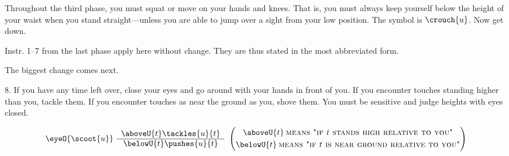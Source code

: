 Throughout the third phase, you must squat or move on your hands 
and knees. That is, you must always keep yourself below the height of your 
waist when you stand straight---unless you are able to jump over a sight from 
your low position. The symbol is $\crouch{u}$. Now get down. 

Instr. 1--7 from the last phase apply here without change. They are thus 
stated in the most abbreviated form. 

\vfill


\vfill
The biggest change comes next. 

\vfill
8. If you have any time left over, close your eyes and go around with 
your hands in front of you. If you encounter touches standing higher than 
you, tackle them. If you encounter touches as near the ground as you, shove 
them. You must be sensitive and judge heights with eyes closed. 

\vfill

\[
	\eyeO{\scoot{u}}\:\:\begin{array}{c c}
		\aboveU{t} \tackles{u}{t} \\ \hline
		\belowU{t} \pushes{u}{t} \\
	\end{array} \:\:
	\left( \begin{gathered}
		\aboveU{t} \: \text{\textsc{means "if $t$ stands high relative to you"}} \\
		\belowU{t} \: \text{\textsc{means "if $t$ is near ground relative to you"}}
	\end{gathered} \right)
	\]

